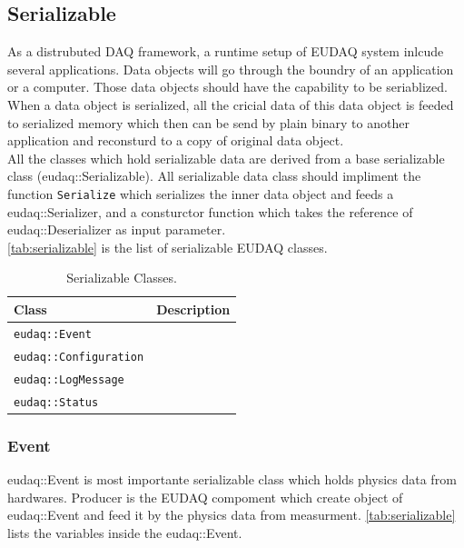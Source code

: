\subsection{Serializable}
As a distrubuted DAQ framework, a runtime setup of EUDAQ system inlcude several applications. Data objects will go through the boundry of an application or a computer. Those data objects should have the capability to be seriablized. When a data object is serialized, all the cricial data of this data object is feeded to serialized memory which then can be send by plain binary to another application and reconsturd to a copy of original data object. \\

All the classes which hold serializable data are derived from a base serializable class (eudaq::Serializable). All serializable data class
should impliment the function \texttt{Serialize} which serializes the inner data object and feeds a eudaq::Serializer, and a consturctor function which takes the reference of eudaq::Deserializer as input parameter.\\

\autoref{tab:serializable} is the list of serializable EUDAQ classes.

\begin{table}
\centering
\small
\begin{tabular}{ l | l }
  \textbf{Class} & \textbf{Description}\\
  \hline
  \texttt{eudaq::Event} & \\
  \texttt{eudaq::Configuration} & \\
  \texttt{eudaq::LogMessage} & \\
  \texttt{eudaq::Status} &  \\
\end{tabular}
\caption{Serializable Classes.}
\label{tab:serializable}
\end{table}

\subsubsection{Event}
eudaq::Event is most importante serializable class which holds physics data from hardwares. Producer is the EUDAQ compoment which create object of eudaq::Event and feed it by the physics data from measurment.  \autoref{tab:serializable} lists the variables inside the eudaq::Event. \\

